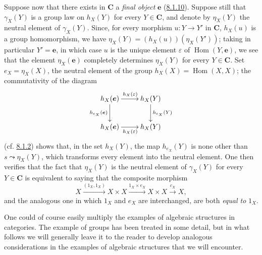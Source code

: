 \begin{env}[8.2.7]
\label{0.8.2.7}
Suppose now that there exists in $\boldsymbol{C}$ a \emph{final object} $\boldsymbol{e}$
(\hyperref[0.8.1.10]{8.1.10}). Suppose still that $\gamma_X(Y)$ is
a group law on $h_X(Y)$ for every $Y\in \boldsymbol{C}$, and denote by
$\eta_X(Y)$ the neutral element of $\gamma_X(Y)$. Since, for every morphism
$u:Y\to Y'$ in $\boldsymbol{C}$, $h_X(u)$ is a group homomorphism, we have
$\eta_X(Y)=(h_X(u))(\eta_X(Y'))$; taking in particular $Y'=\boldsymbol{e}$, in which case
$u$ is the unique element $\varepsilon$ of $\operatorname{Hom}(Y,\boldsymbol{e})$, we see
that the element $\eta_X(\boldsymbol{e})$ completely determines $\eta_X(Y)$ for every
$Y\in \boldsymbol{C}$. Set $e_X=\eta_X(X)$, the neutral element of the group
$h_X(X)=\operatorname{Hom}(X,X)$; the commutativity of the diagram
\[
  \xymatrix{
    h_X(\boldsymbol{e})\ar[r]^{h_X(\varepsilon)}\ar[d]_{h_{e_X}(\boldsymbol{e})} &
    h_X(Y)\ar[d]^{h_{e_X}(Y)}\\
    h_X(\boldsymbol{e})\ar[r]_{h_X(\varepsilon)} & h_X(Y)
  }
\]
(cf. \hyperref[0.8.1.2]{8.1.2}) shows that, in the set $h_X(Y)$,
the map $h_{e_X}(Y)$ is none other than
$s\leadsto\eta_X(Y)$, which transforms every element into the neutral element.
One then verifies that the fact that $\eta_X(Y)$ is the neutral element of
$\gamma_X(Y)$ for every $Y\in \boldsymbol{C}$ is equivalent to saying that the composite
morphism
\[
  X\xrightarrow{(1_X,1_X)}X\times X
  \xrightarrow{1_X\times e_X}X\times X\xrightarrow{c_X}X,
\]
and the analogous one in which $1_X$ and $e_X$ are interchanged, are both
\emph{equal to} $1_X$.
\end{env}

\begin{env}[8.2.8]
\label{0.8.2.8}
One could of course easily multiply the examples of algebraic
structures in categories. The example of groups has been treated in some
detail, but in what follows we will generally leave it to the reader to
develop analogous considerations in the examples of algebraic structures
that we will encounter.
\end{env}

